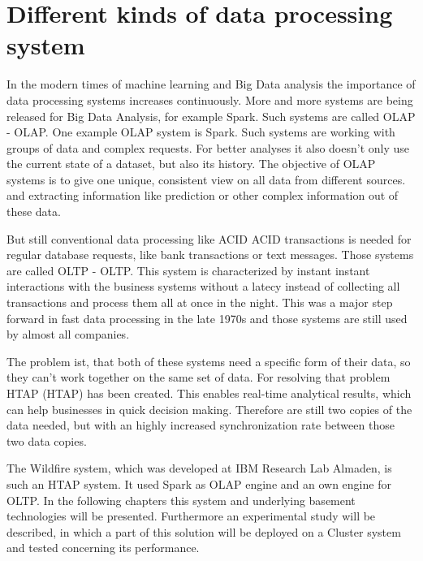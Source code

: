 \section{Different kinds of data processing system}

In the modern times of machine learning and Big Data analysis the importance of data processing systems increases continuously. More and more systems are being released for Big Data Analysis, for example Spark. Such systems are called \acs{OLAP} - \acl{OLAP}. One example OLAP system is \acs{Spark}. Such systems are working with groups of data and complex requests. For better analyses it also doesn't only use the current state of a dataset, but also its history. The objective of OLAP systems is to give one unique, consistent view on all data from different sources. and extracting information like prediction or other complex information out of these data.


But still conventional data processing like \acs{ACID} \acl{ACID} transactions is needed for regular database requests, like bank transactions or text messages. Those systems are called \acl{OLTP} - \acl{OLTP}. This system is characterized by instant instant interactions with the business systems without a latecy instead of collecting all transactions and process them all at once in the night. This was a major step forward in fast data processing in the late 1970s and those systems are still used by almost all companies.


The problem ist, that both of these systems need a specific form of their data, so they can't work together on the same set of data. For resolving that problem \acs{HTAP} (\acl{HTAP}) has been created. This enables real-time analytical results, which can help businesses in quick decision making. Therefore are still two copies of the data needed, but with an highly increased synchronization rate between those two data copies.

The Wildfire system, which was developed at IBM Research Lab Almaden, is such an HTAP system. It used Spark as OLAP engine and an own engine for OLTP. In the following chapters this system and underlying basement technologies will be presented. Furthermore an experimental study will be described, in which a part of this solution will be deployed on a Cluster system and tested concerning its performance. 

